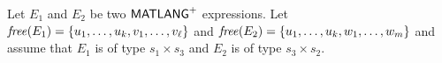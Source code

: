 %
%
Let $E_1$ and $E_2$ be two $\mathsf{MATLANG}^{\sf +}$ expressions. Let $\operatorname{\mathit{free}}(E_1)=\{u_1,\ldots,u_k,v_1,\ldots,v_\ell\}$ and $\operatorname{\mathit{free}}(E_2)=\{u_1,\ldots,u_k,w_1,\ldots,w_m\}$ and
assume that  $E_1$ is of type $s_1 \times s_3$ and $E_2$ is of type $s_3 \times s_2$.

